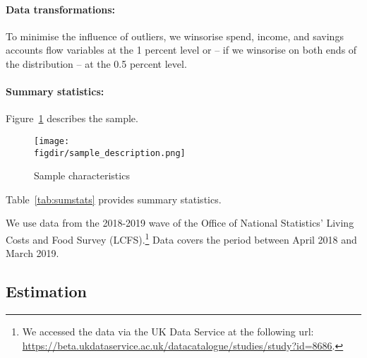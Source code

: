 \paragraph{Data transformations:}%
\label{par:data_transformations}

To minimise the influence of outliers, we winsorise spend, income, and savings
accounts flow variables at the 1 percent level or -- if we winsorise on both
ends of the distribution -- at the 0.5 percent level.


\paragraph{Summary statistics:}%
\label{par:summary_statistics}

Figure~\ref{fig:sample_description} describes the sample.

\begin{figure}[H]
    \centering
    \caption{Sample characteristics}
    \texttt{[image: \\figdir/sample\_description.png]}
    \label{fig:sample_description}
\end{figure}

Table~\ref{tab:sumstats} provides summary statistics.



We use data from the 2018-2019 wave of the Office of National Statistics' Living Costs and Food
Survey (LCFS).\footnote{We accessed the data via the UK Data Service at the
following url:
\url{https://beta.ukdataservice.ac.uk/datacatalogue/studies/study?id=8686}.}
Data covers the period between April 2018 and March 2019.


\subsection{Estimation}%
\label{sub:estimation}


